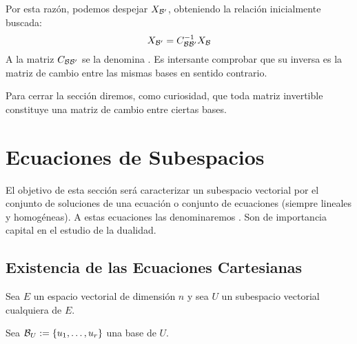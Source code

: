 Por esta razón, podemos despejar $X_{\mathcal{B}'}$, obteniendo la relación inicialmente buscada:
\begin{equation}
	X_{\mathcal{B}'}=C_{\mathcal{B}\mathcal{B}'}^{-1}X_{\mathcal{B}}
\end{equation}
A la matriz $C_{\mathcal{B}\mathcal{B}'}$ se la denomina . Es intersante comprobar que su inversa es la matriz de cambio entre las mismas bases en sentido contrario.

Para cerrar la sección diremos, como curiosidad, que toda matriz invertible constituye una matriz de cambio entre ciertas bases.

\section{Ecuaciones de Subespacios}
El objetivo de esta sección será caracterizar un subespacio vectorial por el conjunto de soluciones de una ecuación o conjunto de ecuaciones (siempre lineales y homogéneas). A estas ecuaciones las denominaremos . Son de importancia capital en el estudio de la dualidad.
\subsection{Existencia de las Ecuaciones Cartesianas}
Sea $E$ un espacio vectorial de dimensión $n$ y sea $U$ un subespacio vectorial cualquiera de $E$.

Sea $\mathcal{B}_U:=\{u_1,\dots,u_r\}$ una base de $U$.
